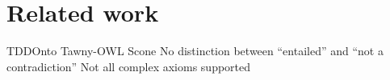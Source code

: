 \documentclass[paper.tex]{subfiles}
\begin{document}
\section{Related work}
\label{sec:related}

\begin{todos}
  \todo TDDOnto
  \todo Tawny-OWL
  \todo Scone
  \todo No distinction between ``entailed'' and ``not a contradiction''
  \todo Not all complex axioms supported
\end{todos}
\end{document}
